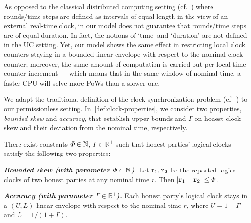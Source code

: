 \begin{remark}
    As opposed to the classical distributed computing setting (cf.~\cite{JACM:DwoLynSto88}) where rounds/time steps are defined as intervals of equal length in the view of an external real-time clock, in our model \funcDriftingClock does not guarantee that rounds/time steps are of equal duration.
    In fact, the notions of `time' and `duration' are not defined in the UC setting.
    Yet, our model shows the same effect in restricting local clock counters staying in a bounded linear envelope with respect to the nominal clock counter; moreover, the same amount of computation is carried out per local time counter increment --- which means that in the same window of nominal time, a faster CPU will solve more PoWs than a slower one.
\end{remark}



We adapt the traditional definition of the clock synchronization problem (cf.~\cite{JCSS:DHS86,JACM:SriTou87}) to our permissionless setting.
%
In~\cref{def:clock-properties}, we consider two properties, \emph{bounded skew} and \emph{accuracy}, that establish upper bounds \maxSkew and $\varGamma$ on honest clock skew and their deviation from the nominal time, respectively.

\begin{definition}
    \label{def:clock-properties}
    There exist constants $\varPhi \in \mathbb{N}$, $\varGamma \in \mathbb{R}^+$ such that honest parties' logical clocks satisfy the following two properties:
    \begin{cccItemize}[nosep]
        \item \emph{\bf Bounded skew (with parameter $\varPhi \in \mathbb{N}$).}
        Let $\mathtt{r}_1, \mathtt{r}_2$ be the reported logical clocks of two
        honest parties at any nominal time $r$.
        Then $|\mathtt{r}_ 1 - \mathtt{r}_2| \le \varPhi$.

        \item \emph{\bf Accuracy (with parameter $\varGamma \in \mathbb{R}^+$).}
        Each honest party's logical clock stays in a $(U, L)$-linear envelope with respect to the nominal time $r$, where $U = 1 + \varGamma$ and $L = 1 / (1 + \varGamma)$.
    \end{cccItemize}
\end{definition}
